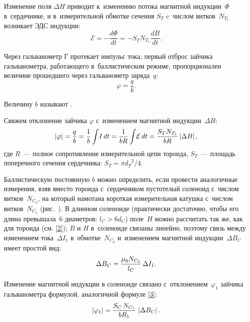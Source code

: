 Изменение поля $\Delta H$ приводит к~изменению потока магнитной индукции~$\Phi$ в~сердечнике, и в~измерительной обмотке
сечения $S_T$ c~числом витков~$N_{T_1}$ возникает ЭДС индукции:
\begin{equation*}
	\mathcal{E}=-\frac{d\Phi}{dt}=-S_T N_{T_1}\frac{dB}{dt}.
\end{equation*}

Через гальванометр Г протекает импульс тока; первый отброс зайчика
гальванометра, работающего в~баллистическом режиме,
пропорционален величине прошедшего через гальванометр заряда~$q$:
\begin{equation*}
	\varphi=\frac{q}{b}.
\end{equation*}

Величину $b$ называют .

Свяжем отклонение зайчика $\varphi$ с~изменением магнитной индукции~$\Delta B$:
\begin{equation}
	\eqmark{3}
	|\varphi|=\frac{q}{b}=\frac{1}{b}\int\! I\,dt= \frac{1}{bR}\int\!
\mathcal{E}\,dt=\frac{S_T N_{T_1}}{bR}\left| \Delta B \right|,
\end{equation}
где $R$~--- полное сопротивление измерительной цепи тороида, $S_T$~--- площадь поперечного сечения сердечника: $S_T=\pi
{d_T}^2/4$.

Баллистическую постоянную $b$ можно определить, если провести аналогичные измерения, взяв вместо тороида с~сердечником
пустотелый соленоид с~числом витков~$N_{C_0}$, на который намотана короткая измерительная катушка с~числом
витков~$N_{C_1}$ (рис.~). В длинном соленоиде (практически достаточно, чтобы его длина превышала~6 диаметров: $l_C >
6d_C$) поле~$H$ можно рассчитать так же, как для тороида (см. \eqref{2}); $B$ и $H$ в~соленоиде связаны линейно, поэтому
связь между изменением тока~$\Delta I_1$ в~обмотке~$N_{C_0}$ и~изменением магнитной индукции~$\Delta B_C$ имеет простой вид:
\begin{equation}%
	\eqmark{4}
	\Delta B_C=\frac{\mu_0 N_{C_0}}{l_C}\,\Delta I_1.
\end{equation}

Изменение магнитной индукции в соленоиде связано с~отклонением~$\varphi_1$ зайчика гальванометра формулой, аналогичной
формуле \eqref{3}:
\begin{equation}%
	\eqmark{5}
	\left| \varphi_1 \right|=\frac{S_C\,N_{C_1}}{bR_1}\,\left|\Delta B_C \right|.
\end{equation}

